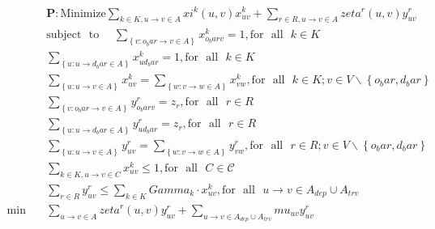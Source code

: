 \begin{align}
  & \mathbf{P} : \text{Minimize} \sum_{k \in K, u \rightarrow v \in A} \mathit{xi}^{k} \left(u , v\right) x_{u v}^{k} + \sum_{r \in R, u \rightarrow v \in A} \mathit{zeta}^{r} \left(u , v\right) y_{u v}^{r} \tag{eq\_0009} \\
  & \text{subject}\textrm{ }\text{to}\textrm{ }\textrm{ } \underset{\left\{v : o_bar \rightarrow v \in A\right\}}{\sum} x_{o_bar v}^{k} = 1 , \text{for}\textrm{ }\text{all}\textrm{ } k \in K \tag{eq\_0011} \\
  & \underset{\left\{u : u \rightarrow d_bar \in A\right\}}{\sum} x_{u d_bar}^{k} = 1 , \text{for}\textrm{ }\text{all}\textrm{ } k \in K \tag{eq\_0012} \\
  & \sum_{\left\{u : u \rightarrow v \in A\right\}} x_{u v}^{k} = \sum_{\left\{w : v \rightarrow w \in A\right\}} x_{v w}^{k} , \text{for}\textrm{ }\text{all}\textrm{ } k \in K ; v \in V \backslash \left\{o_bar , d_bar\right\} \tag{eq\_0013} \\
  & \underset{\left\{v : o_bar \rightarrow v \in A\right\}}{\sum} y_{o_bar v}^{r} = z_{r} , \text{for}\textrm{ }\text{all}\textrm{ } r \in R \tag{eq\_0014} \\
  & \underset{\left\{u : u \rightarrow d_bar \in A\right\}}{\sum} y_{u d_bar}^{r} = z_{r} , \text{for}\textrm{ }\text{all}\textrm{ } r \in R \tag{eq\_0015} \\
  & \sum_{\left\{u : u \rightarrow v \in A\right\}} y_{u v}^{r} = \sum_{\left\{w : v \rightarrow w \in A\right\}} y_{v w}^{r} , \text{for}\textrm{ }\text{all}\textrm{ } r \in R ; v \in V \backslash \left\{o_bar , d_bar\right\} \tag{eq\_0016} \\
  & \sum_{k \in K, u \rightarrow v \in C} x_{u v}^{k} \leq 1 , \text{for}\textrm{ }\text{all}\textrm{ } C \in \mathcal{C} \tag{eq\_0017} \\
  & \sum_{r \in R} y_{u v}^{r} \leq \sum_{k \in K} \mathit{Gamma}_{k} \cdot x_{u v}^{k} , \text{for}\textrm{ }\text{all}\textrm{ } u \rightarrow v \in A_{d e p} \cup A_{t r v} \tag{eq\_0018} \\
  \min\quad & \sum_{u\rightarrow v\in A} \mathit{zeta}^r(u,v) y_{uv}^r + \sum_{u\rightarrow v\in A_{dep}\cup A_{trv}} \mathit{mu}_{uv} y_{uv}^r \tag{eq\_0024} \\
\end{align}
